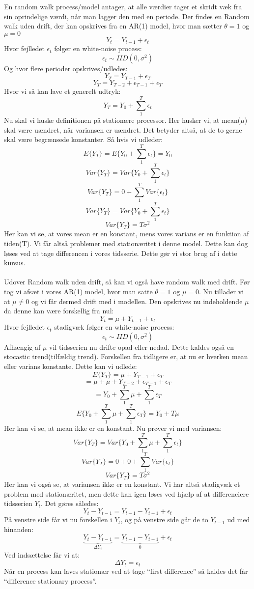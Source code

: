 \documentclass[
  10pt,
]{article}
\begin{document}
En random walk process/model antager, at alle værdier tager et skridt
væk fra sin oprindelige værdi, når man lagger den med en periode. Der
findes en Random walk uden drift, der kan opskrives fra en AR(1) model,
hvor man sætter \(\theta=1\) og \(\mu=0\) \[ Y_t = Y_{t-1}+ \epsilon_t\]
Hvor fejlledet \(\epsilon_t\) følger en white-noise process:
\[\epsilon_t\sim IID(0,\sigma^2) \] Og hvor flere perioder
opskrives/udledes: \[Y_T=Y_{T-1}+\epsilon_T \]
\[Y_T=Y_{T-2}+\epsilon_{T-1}+\epsilon_T \] Hvor vi så kan lave et
generelt udtryk: \[Y_T=Y_0 + \sum_1^T \epsilon_t\] Nu skal vi huske
definitionen på stationære processor. Her husker vi, at mean(\(\mu\))
skal være uændret, når variansen er uændret. Det betyder altså, at de to
gerne skal være begrænsede konstanter. Så hvis vi udleder:
\[E\{Y_T\}=E\{Y_0+\sum_1^T\epsilon_t\}=Y_0 \tag{mean} \]
\[Var\{Y_T\}=Var\{Y_0+\sum_1^T\epsilon_t\}\]
\[Var\{Y_T\}=0+\sum_1^TVar\{\epsilon_t\}\]
\[Var\{Y_T\}=Var\{Y_0+\sum_1^T\epsilon_t\} \]
\[Var\{Y_T\}=T\sigma^2  \tag{Variance} \] Her kan vi se, at vores mean
er en konstant, mens vores varians er en funktion af tiden(T). Vi får
altså problemer med stationæritet i denne model. Dette kan dog løses ved
at tage differencen i vores tidsserie. Dette gør vi stor brug af i dette
kursus.\\
~\\
Udover Random walk uden drift, så kan vi også have random walk med
drift. Før tog vi afsæt i vores AR(1) model, hvor man satte \(\theta=1\)
og \(\mu=0\). Nu tillader vi at \(\mu\neq0\) og vi får dermed drift med
i modellen. Den opskrives nu indeholdende \(\mu\) da denne kan være
forskellig fra nul: \[ Y_t = \mu+ Y_{t-1}+ \epsilon_t\] Hvor fejlledet
\(\epsilon_t\) stadigvæk følger en white-noise process:
\[\epsilon_t\sim IID(0,\sigma^2) \] Afhængig af \(\mu\) vil tidsserien
nu drifte opad eller nedad. Dette kaldes også en stocastic
trend(tilfældig trend). Forskellen fra tidligere er, at nu er hverken
mean eller varians konstante. Dette kan vi udlede:
\[E\{Y_T\}=\mu+Y_{T-1}+\epsilon_T \]
\[= \mu+\mu+Y_{T-2}+\epsilon_{T-1}+\epsilon_T \]
\[=Y_0+\sum_1^T\mu+\sum_1^T\epsilon_T \]
\[E \{Y_0+\sum_1^T\mu+\sum_1^T\epsilon_T\} = Y_0+T\mu \tag{mean}  \] Her
kan vi se, at mean ikke er en konstant. Nu prøver vi med variansen:
\[ Var\{Y_T\}=Var\{Y_0+\sum_1^T\mu+\sum_1^T\epsilon_t\}      \]
\[ Var\{Y_T\} = 0+0+\sum_1^TVar\{\epsilon_t\} \]
\[ Var\{Y_T\} = T\sigma^2 \] Her kan vi også se, at variansen ikke er en
konstant. Vi har altså stadigvæk et problem med stationæritet, men dette
kan igen løses ved hjælp af at differenciere tidsserien \(Y_t\). Det
gøres således:\\
\[Y_t - Y_{t-1} = Y_{t-1} - Y_{t-1} + \epsilon_t \] På venstre side får
vi nu forskellen i \(Y_t\), og på venstre side går de to \(Y_{t-1}\) ud
med hinanden:\\
\[\underbrace{Y_t - Y_{t-1}}_\text{$\Delta Y_t$} = \underbrace{Y_{t-1} - Y_{t-1}}_\text{0} + \epsilon_t \]
Ved indsættelse får vi at:\\
\[\Delta Y_t = \epsilon_t \] Når en process kan laves stationær ved at
tage ``first difference'' så kaldes det får ``difference stationary
process''.\\
\end{document}
